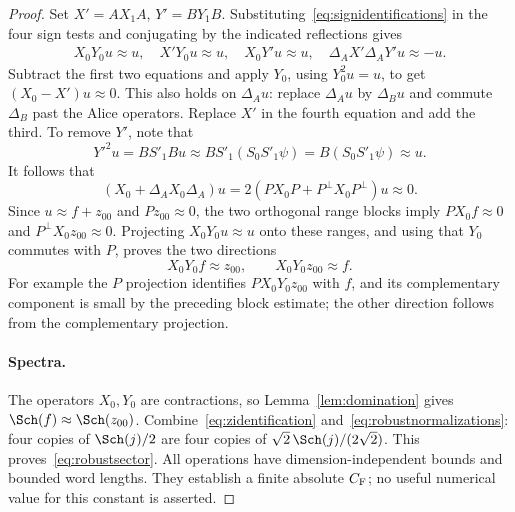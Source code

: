 \begin{proof}
Set $X'=AX_1A$, $Y'=BY_1B$. Substituting~\eqref{eq:signidentifications}
in the four sign tests and conjugating by the indicated reflections gives
\begin{gather}\label{eq:fourfrustration}
X_0Y_0u\approx u,\quad X'Y_0u\approx u,\quad X_0Y'u\approx u,
\quad\Delta_AX'\Delta_AY'u\approx-u.
\end{gather}
Subtract the first two equations and apply $Y_0$, using $Y_0^2u=u$,
to get $(X_0-X')u\approx0$. This also holds on $\Delta_Au$:
replace $\Delta_Au$ by $\Delta_Bu$ and commute $\Delta_B$ past the
Alice operators. Replace $X'$ in the fourth equation and add the third.
To remove $Y'$, note that
\[
Y'^2u=BS'_1Bu\approx BS'_1(S_0S'_1\psi)
=B(S_0S'_1\psi)\approx u.
\]
It follows that
\[
(X_0+\Delta_AX_0\Delta_A)u
=2(PX_0P+P^\perp X_0P^\perp)u\approx0.
\]
Since $u\approx f+z_{00}$ and $Pz_{00}\approx0$, the two orthogonal
range blocks imply $PX_0f\approx0$ and $P^\perp X_0z_{00}\approx0$.
Projecting $X_0Y_0u\approx u$ onto these ranges, and using that $Y_0$
commutes with $P$, proves the two directions
\begin{equation}\label{eq:robustbridge}
X_0Y_0f\approx z_{00},\qquad X_0Y_0z_{00}\approx f.
\end{equation}
For example the $P$ projection identifies $PX_0Y_0z_{00}$ with $f$,
and its complementary component is small by the preceding block estimate;
the other direction follows from the complementary projection.

\paragraph{Spectra.}
The operators $X_0,Y_0$ are contractions, so
Lemma~\ref{lem:domination} gives $\Sch(f)\approx\Sch(z_{00})$.
Combine~\eqref{eq:zidentification} and~\eqref{eq:robustnormalizations}:
four copies of $\Sch(j)/2$ are four copies of
$\sqrt2\,\Sch(j)/(2\sqrt2)$. This proves~\eqref{eq:robustsector}.
All operations have dimension-independent bounds and bounded word lengths.
They establish a finite absolute $C_{\rm F}$; no useful numerical value
for this constant is asserted.
\end{proof}

